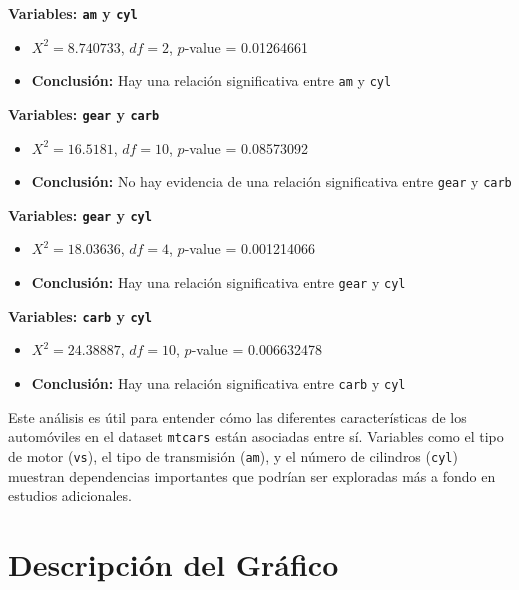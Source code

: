 \documentclass{article}
\begin{document}
\begin{flushleft}
\textbf{Variables: \texttt{am} y \texttt{cyl}}
\begin{itemize}
    \item $X^2 = 8.740733$, $df = 2$, $p$-value = 0.01264661
    \item \textbf{Conclusión:} Hay una relación significativa entre \texttt{am} y \texttt{cyl}
\end{itemize}

\textbf{Variables: \texttt{gear} y \texttt{carb}}
\begin{itemize}
    \item $X^2 = 16.5181$, $df = 10$, $p$-value = 0.08573092
    \item \textbf{Conclusión:} No hay evidencia de una relación significativa entre \texttt{gear} y \texttt{carb}
\end{itemize}

\textbf{Variables: \texttt{gear} y \texttt{cyl}}
\begin{itemize}
    \item $X^2 = 18.03636$, $df = 4$, $p$-value = 0.001214066
    \item \textbf{Conclusión:} Hay una relación significativa entre \texttt{gear} y \texttt{cyl}
\end{itemize}

\textbf{Variables: \texttt{carb} y \texttt{cyl}}
\begin{itemize}
    \item $X^2 = 24.38887$, $df = 10$, $p$-value = 0.006632478
    \item \textbf{Conclusión:} Hay una relación significativa entre \texttt{carb} y \texttt{cyl}
\end{itemize}
\end{flushleft}

Este análisis es útil para entender cómo las diferentes características de los automóviles en el dataset \texttt{mtcars} están asociadas entre sí. Variables como el tipo de motor (\texttt{vs}), el tipo de transmisión (\texttt{am}), y el número de cilindros (\texttt{cyl}) muestran dependencias importantes que podrían ser exploradas más a fondo en estudios adicionales.

\section{Descripción del Gráfico}
\end{document}
